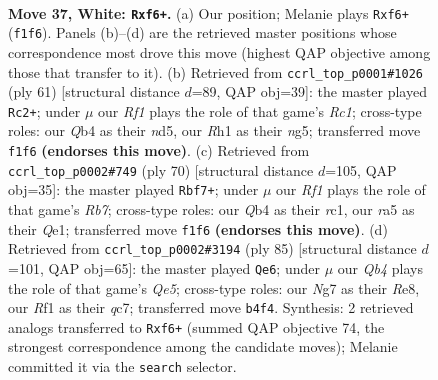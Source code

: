 \documentclass[11pt]{article}
\begin{document}
\clearpage

\begin{figure}[p]\centering
\begin{subfigure}{0.46\textwidth}\centering
\resizebox{\linewidth}{!}{%
\newchessgame
\chessboard[
  setfen={7r/1b1q1kN1/5n2/r3P3/1Q5p/3B3P/1p4P1/5RKR w - - 6 37},
  showmover=false,
  pgfstyle=straightmove, color=movearrow, markmove={f1-f6}
]}
\caption{}
\end{subfigure}\hfill
\begin{subfigure}{0.46\textwidth}\centering
\resizebox{\linewidth}{!}{%
\newchessgame
\chessboard[
  setfen={2rk4/p2b4/5r2/3NQ1Np/5ppP/3P4/P2K1p2/5R1q b - - 0 31},
  showmover=false,
  pgfstyle=straightmove, color=movearrow, markmove={c8-c2}
]}
\caption{}
\end{subfigure}
\\[4pt]
\begin{subfigure}{0.46\textwidth}\centering
\resizebox{\linewidth}{!}{%
\newchessgame
\chessboard[
  setfen={5k2/1R4R1/4p2p/p2p2q1/3Pn3/P6P/5PP1/2r1Q1K1 w - - 1 36},
  showmover=false,
  pgfstyle=straightmove, color=movearrow, markmove={b7-f7}
]}
\caption{}
\end{subfigure}\hfill
\begin{subfigure}{0.46\textwidth}\centering
\resizebox{\linewidth}{!}{%
\newchessgame
\chessboard[
  setfen={4r2k/2Q3pr/1p3p2/p4N1p/3Bq2P/5R2/PP3K2/8 b - - 1 43},
  showmover=false,
  pgfstyle=straightmove, color=movearrow, markmove={e4-e6}
]}
\caption{}
\end{subfigure}
\caption{\textbf{Move 37, White: \texttt{Rxf6+}.} (a) Our position; Melanie plays \texttt{Rxf6+} (\texttt{f1f6}). Panels (b)--(d) are the retrieved master positions whose correspondence most drove this move (highest QAP objective among those that transfer to it). (b) Retrieved from \texttt{ccrl\_top\_p0001\#1026} (ply 61) [structural distance $d$=89, QAP obj=39]: the master played \texttt{Rc2+}; under $\mu$ our \emph{Rf1} plays the role of that game's \emph{Rc1}; cross-type roles: our \emph{Q}b4 as their \emph{n}d5, our \emph{R}h1 as their \emph{n}g5; transferred move \texttt{f1f6} \textbf{(endorses this move)}. (c) Retrieved from \texttt{ccrl\_top\_p0002\#749} (ply 70) [structural distance $d$=105, QAP obj=35]: the master played \texttt{Rbf7+}; under $\mu$ our \emph{Rf1} plays the role of that game's \emph{Rb7}; cross-type roles: our \emph{Q}b4 as their \emph{r}c1, our \emph{r}a5 as their \emph{Q}e1; transferred move \texttt{f1f6} \textbf{(endorses this move)}. (d) Retrieved from \texttt{ccrl\_top\_p0002\#3194} (ply 85) [structural distance $d$=101, QAP obj=65]: the master played \texttt{Qe6}; under $\mu$ our \emph{Qb4} plays the role of that game's \emph{Qe5}; cross-type roles: our \emph{N}g7 as their \emph{R}e8, our \emph{R}f1 as their \emph{q}c7; transferred move \texttt{b4f4}. Synthesis: 2 retrieved analogs transferred to \texttt{Rxf6+} (summed QAP objective 74, the strongest correspondence among the candidate moves); Melanie committed it via the \texttt{search} selector.}
\label{fig:thought-m72}
\end{figure}
\end{document}
